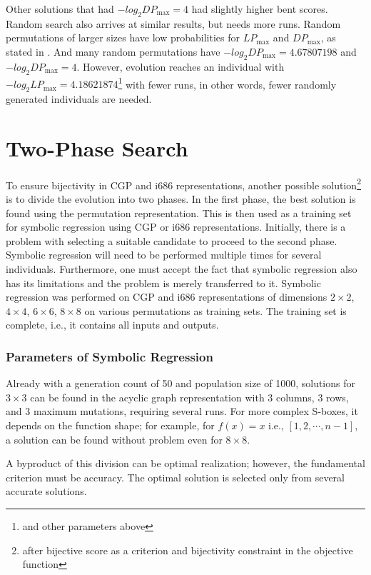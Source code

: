 Other solutions that had $-log_2{DP_{\max}} = 4$ had slightly higher bent scores.
Random search also arrives at similar results, but needs more runs.
Random permutations of larger sizes have low probabilities for
$LP_{\max}$ and $DP_{\max}$, as stated in \cite{bigSboxes}. And many random permutations have
$-log_2{DP_{\max}} = 4.67807198$ and $-log_2{DP_{\max}} = 4$.
However, evolution reaches an individual with $-log_2{LP_{\max}} = 4.18621874$\footnote{and other parameters above}
with fewer runs, in other words, fewer randomly generated
individuals are needed.

\pagebreak
\section{Two-Phase Search}
To ensure bijectivity in CGP and i686 representations, another possible
solution\footnote{after bijective score as a criterion and bijectivity constraint in the objective
function}
is to divide the evolution into two phases.
In the first phase, the best solution is found using the permutation representation. This is then
used as a training set for symbolic regression using CGP or i686 representations.
Initially, there is a problem with selecting
a suitable candidate to proceed to the second phase. Symbolic regression will need
to be performed multiple times for several individuals. Furthermore, one must accept
the fact that symbolic regression also has its limitations and the problem is merely transferred to it.
Symbolic regression was performed
on CGP and i686 representations of dimensions $2 \times 2$, $4 \times 4$, $6 \times 6$, $8 \times 8$
on various permutations as training sets.
The training set is complete, i.e., it contains all inputs and outputs.

\subsubsection{Parameters of Symbolic Regression}
Already with a generation count of 50 and population size of 1000, solutions for $3 \times 3$ can be found
in the acyclic graph representation with 3 columns, 3 rows, and 3 maximum mutations, requiring
several runs. For more complex S-boxes, it depends on the function shape; for example, for
$f(x) =  x$ i.e., $[1, 2, \cdots, n - 1]$, a solution can be found without problem even for
$8 \times 8$.

A byproduct of this division can be optimal realization; however,
the fundamental criterion must be accuracy. The optimal solution is selected only from several
accurate solutions.

